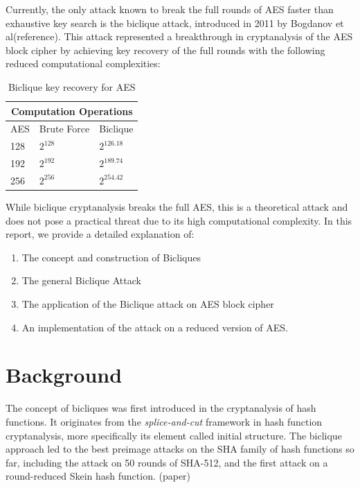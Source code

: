 \documentclass{rapport}
\begin{document}
Currently, the only attack known to break the full rounds of AES faster than exhaustive key search is the biclique attack, introduced in 2011 by Bogdanov et al(reference). This attack represented a breakthrough in cryptanalysis of the AES block cipher by achieving key recovery of the full rounds with the following reduced computational complexities: 

\begin{table}[h!]
    \centering
    \begin{tabular}{|p{3cm}|p{3cm}|p{3cm}|}
        \hline
        \multicolumn{3}{|c|}{Computation Operations} \\
        \hline
        AES & Brute Force & Biclique \\
        \hline
        128 & $2^{128}$ & $2^{126.18}$ \\
        \hline
        192 & $2^{192}$ & $2^{189.74}$ \\
        \hline
        256 & $2^{256}$ & $2^{254.42}$ \\
        \hline
    \end{tabular}
    \caption{Biclique key recovery for AES}
    \label{table:1}
\end{table}

While biclique cryptanalysis breaks the full AES, this is a theoretical attack and does not pose a practical threat due to its high computational complexity. In this report, we provide a detailed explanation of: 
\begin{enumerate}
    \item     The concept and construction of Bicliques 
    \item     The general Biclique Attack 
    \item     The application of the Biclique attack on AES block cipher 
    \item     An implementation of the attack on a reduced version of AES. 
\end{enumerate}

\newpage
\section{Background}
The concept of bicliques was first introduced in the cryptanalysis of hash functions. It originates from the \emph{splice-and-cut} framework in hash function cryptanalysis, more specifically its element called initial structure. The biclique approach led to the best preimage attacks on the SHA family of hash functions so far, including the attack on 50 rounds of SHA-512, and the first attack on a round-reduced Skein hash function. (paper) 
\end{document}
